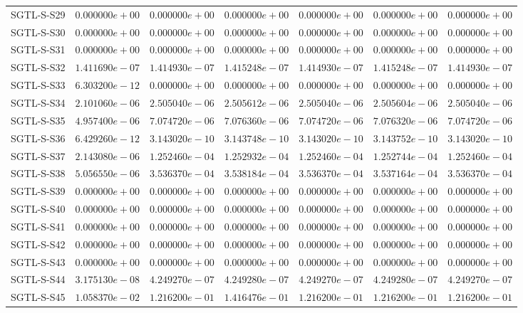 \begin{longtable}{lrrrrrr}
SGTL-S-S29 & $0.000000e+00$ & $0.000000e+00$ & $0.000000e+00$ & $0.000000e+00$ & $0.000000e+00$ & $0.000000e+00$ \\
SGTL-S-S30 & $0.000000e+00$ & $0.000000e+00$ & $0.000000e+00$ & $0.000000e+00$ & $0.000000e+00$ & $0.000000e+00$ \\
SGTL-S-S31 & $0.000000e+00$ & $0.000000e+00$ & $0.000000e+00$ & $0.000000e+00$ & $0.000000e+00$ & $0.000000e+00$ \\
SGTL-S-S32 & $1.411690e-07$ & $1.414930e-07$ & $1.415248e-07$ & $1.414930e-07$ & $1.415248e-07$ & $1.414930e-07$ \\
SGTL-S-S33 & $6.303200e-12$ & $0.000000e+00$ & $0.000000e+00$ & $0.000000e+00$ & $0.000000e+00$ & $0.000000e+00$ \\
SGTL-S-S34 & $2.101060e-06$ & $2.505040e-06$ & $2.505612e-06$ & $2.505040e-06$ & $2.505604e-06$ & $2.505040e-06$ \\
SGTL-S-S35 & $4.957400e-06$ & $7.074720e-06$ & $7.076360e-06$ & $7.074720e-06$ & $7.076320e-06$ & $7.074720e-06$ \\
SGTL-S-S36 & $6.429260e-12$ & $3.143020e-10$ & $3.143748e-10$ & $3.143020e-10$ & $3.143752e-10$ & $3.143020e-10$ \\
SGTL-S-S37 & $2.143080e-06$ & $1.252460e-04$ & $1.252932e-04$ & $1.252460e-04$ & $1.252744e-04$ & $1.252460e-04$ \\
SGTL-S-S38 & $5.056550e-06$ & $3.536370e-04$ & $3.538184e-04$ & $3.536370e-04$ & $3.537164e-04$ & $3.536370e-04$ \\
SGTL-S-S39 & $0.000000e+00$ & $0.000000e+00$ & $0.000000e+00$ & $0.000000e+00$ & $0.000000e+00$ & $0.000000e+00$ \\
SGTL-S-S40 & $0.000000e+00$ & $0.000000e+00$ & $0.000000e+00$ & $0.000000e+00$ & $0.000000e+00$ & $0.000000e+00$ \\
SGTL-S-S41 & $0.000000e+00$ & $0.000000e+00$ & $0.000000e+00$ & $0.000000e+00$ & $0.000000e+00$ & $0.000000e+00$ \\
SGTL-S-S42 & $0.000000e+00$ & $0.000000e+00$ & $0.000000e+00$ & $0.000000e+00$ & $0.000000e+00$ & $0.000000e+00$ \\
SGTL-S-S43 & $0.000000e+00$ & $0.000000e+00$ & $0.000000e+00$ & $0.000000e+00$ & $0.000000e+00$ & $0.000000e+00$ \\
SGTL-S-S44 & $3.175130e-08$ & $4.249270e-07$ & $4.249280e-07$ & $4.249270e-07$ & $4.249280e-07$ & $4.249270e-07$ \\
SGTL-S-S45 & $1.058370e-02$ & $1.216200e-01$ & $1.416476e-01$ & $1.216200e-01$ & $1.216200e-01$ & $1.216200e-01$ \\

\end{longtable}
